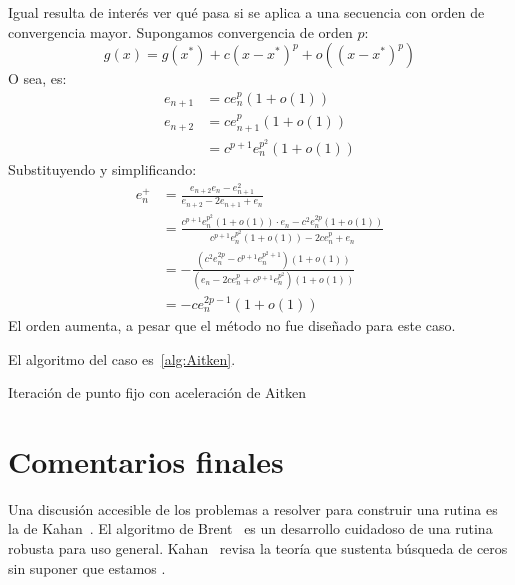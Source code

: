   Igual resulta de interés ver qué pasa si se aplica a una secuencia
  con orden de convergencia mayor.
  Supongamos convergencia de orden \(p\):
  \begin{equation*}
    g(x)
      = g(x^*) + c (x - x^*)^p + o((x - x^*)^p)
  \end{equation*}
  O sea,
  es:
  \begin{align*}
    e_{n + 1}
       &= c e_n^p (1 + o(1)) \\
    e_{n + 2}
       &= c e_{n + 1}^p (1 + o(1)) \\
       &= c^{p + 1} e_n^{p^2} (1 + o(1))
  \end{align*}
  Substituyendo y simplificando:
  \begin{align*}
    e_n^+
      &= \frac{e_{n + 2} e_n - e_{n + 1}^2}
              {e_{n + 2} - 2 e_{n + 1} + e_n} \\
      &= \frac{c^{p + 1} e_n^{p^2} (1 + o(1)) \cdot e_n
                 - c^2 e_n^{2 p} (1 + o(1))}
              {c^{p + 1} e_n^{p^2} (1 + o(1))
                 - 2 c e_n^p + e_n} \\
      &= - \frac{(c^2 e_n^{2 p} - c^{p + 1} e_n^{p^2 + 1}) (1 + o(1))}
                {(e_n - 2 c e_n^p + c^{p + 1} e_n^{p^2}) (1 + o(1))} \\
      &= -c e_n^{2 p - 1} (1 + o(1))
  \end{align*}
  El orden aumenta,
  a pesar que el método no fue diseñado para este caso.

  El algoritmo del caso es~\ref{alg:Aitken}.
  \begin{algorithm}[ht]
    \DontPrintSemicolon\Indp

    \caption{Iteración de punto fijo con aceleración de Aitken}
    \label{alg:Aitken}
  \end{algorithm}

\section{Comentarios finales}
\label{sec:02-final-comments}

  Una discusión accesible de los problemas
  a resolver para construir una rutina 
  es la de Kahan~\cite{kahan79:_calculator_solve_key}.
  El algoritmo de Brent~%
    \cite{brent71:_algor_guaran_conver_findin_zero_funct}
  es un desarrollo cuidadoso de una rutina robusta para uso general.
  Kahan~%
    \cite{kahan16:_lecture_notes_real_root_finding}
  revisa la teoría que sustenta búsqueda de ceros
  sin suponer que estamos .

